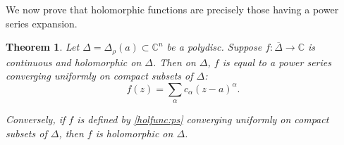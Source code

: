 \documentclass[12pt,openany]{book}
\newcommand{\C}{{\mathbb{C}}}
\theoremstyle{plain}
\newtheorem{thm}{Theorem}[section]
\theoremstyle{remark}
\theoremstyle{definition}
\theoremstyle{exercise}
\theoremstyle{example}
\begin{document}
We now prove that holomorphic functions are precisely those having
a power series expansion.

\begin{thm}
Let $\Delta = \Delta_\rho(a) \subset \C^n$ be a polydisc.
Suppose $f \colon \overline{\Delta} \to \C$ is continuous and
holomorphic on $\Delta$.  Then on $\Delta$, $f$ is equal to a power series 
converging uniformly on compact subsets of $\Delta$:
\begin{equation} \label{holfunc:ps}
f(z) = \sum_{\alpha} c_\alpha {(z-a)}^\alpha .
\end{equation}

Conversely, if $f$ is defined by \eqref{holfunc:ps} converging
uniformly on compact subsets of $\Delta$, then $f$ is holomorphic on
$\Delta$.
\end{thm}
\end{document}
